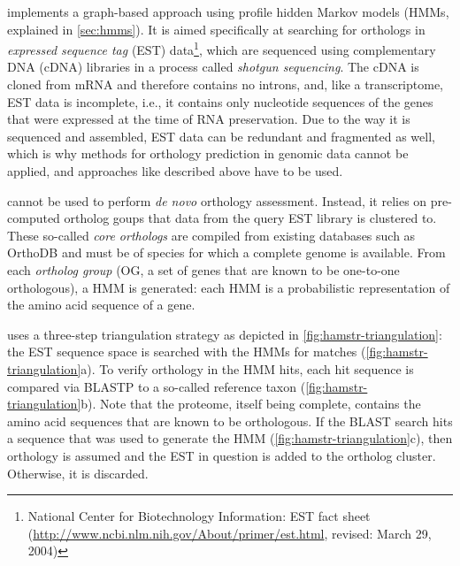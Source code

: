 \hamstr implements a graph-based approach using profile hidden Markov models
(HMMs, explained in \autoref{sec:hmms}). It is aimed specifically at
searching for orthologs in \emph{expressed sequence tag} (EST)
data\footnote{National Center for Biotechnology Information: EST fact sheet
(\url{http://www.ncbi.nlm.nih.gov/About/primer/est.html}, revised: March 29,
2004)}, which are sequenced using complementary DNA (cDNA) libraries in a
process called \emph{shotgun sequencing}. The cDNA is cloned from mRNA and
therefore contains no introns, and, like a transcriptome, EST data is
incomplete, i.e., it contains only nucleotide sequences of the genes that were
expressed at the time of RNA preservation. Due to the way it is sequenced and
assembled, EST data can be redundant and fragmented as well, which is why
methods for orthology prediction in genomic data cannot be applied, and
approaches like described above have to be used.

\hamstr cannot be used to perform \emph{de novo} orthology assessment. Instead,
it relies on pre-computed ortholog goups that data from the query EST library is
clustered to. These so-called \emph{core orthologs} are compiled from existing
databases such as OrthoDB and must be of species for which a complete genome is
available. From each \emph{ortholog group} (OG, a set of genes that are known to
be one-to-one orthologous), a HMM is generated: each HMM is a probabilistic
representation of the amino acid sequence of a gene. 

\hamstr uses a three-step triangulation strategy as depicted in
\autoref{fig:hamstr-triangulation}: the EST sequence space is searched with the
HMMs for matches (\autoref{fig:hamstr-triangulation}a). To verify orthology in
the HMM hits, each hit sequence is compared via BLASTP \citep{altschul1997} to a
so-called reference taxon (\autoref{fig:hamstr-triangulation}b). Note that the
proteome, itself being complete, contains the amino acid sequences that are
known to be orthologous. If the BLAST search hits a sequence that was used to
generate the HMM (\autoref{fig:hamstr-triangulation}c), then orthology is
assumed and the EST in question is added to the ortholog cluster. Otherwise, it
is discarded.



%

